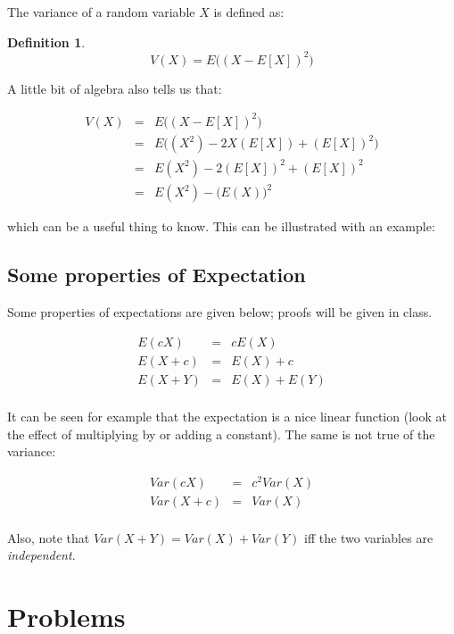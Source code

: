 \documentclass[12pt]{extbook}
\newtheorem{df}{Definition}[section]
\begin{document}
The variance of a random
variable $X$ is defined as:


\begin{df}
\begin{displaymath}
V (X) = E \big( (X-E[X])^2 \big)
\end{displaymath}
\end{df}

A little bit of algebra also tells us that:

\begin{eqnarray*}
V(X) &=& E \big( (X-E[X])^2 \big) \\
 &=& E\big( (X^2)-2X(E[X]) + (E[X])^2 \big) \\
 &=& E(X^2) - 2(E[X])^2 + (E[X])^2\\
 &=& E(X^2) - \big(E(X)\big)^2
\end{eqnarray*}

which can be a useful thing to know.   This can be illustrated with an example:


\subsection{Some properties of Expectation}


Some properties of expectations are given below; proofs will be given in class.

\begin{eqnarray*}
E(cX) &=& cE(X)\\
E(X + c) &=& E(X) + c\\
E(X+Y) &=& E(X) + E(Y)\\
\end{eqnarray*}

It can be seen for example that the expectation is a nice linear
function (look at the effect of multiplying by or adding a constant).
The same is not true of the variance: 

\begin{eqnarray*}
Var(cX) &=& c^2 Var(X)\\
Var(X+c) &=& Var(X) \\
\end{eqnarray*}

Also, note that $Var(X+Y) = Var(X) + Var(Y)$ iff the two variables are \emph{independent}.


\section{Problems}

\begin{enumerate}




\end{enumerate}
\end{document}
